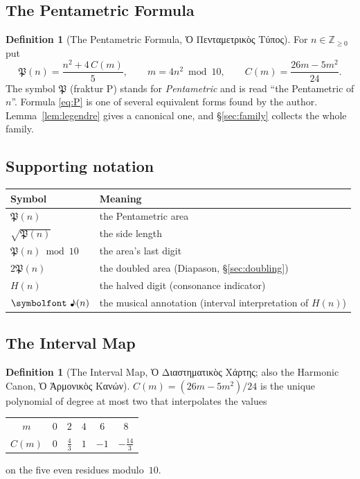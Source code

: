 \documentclass[11pt,a4paper]{article}
\newcommand{\gr}[1]{{\greekfont #1}}                 %
\newcommand{\Pent}{\mathfrak{P}}                      %
\newcommand{\note}{\text{\symbolfont ♪}}              %
\newcommand{\Z}{\mathbb{Z}}
\theoremstyle{plain}
\theoremstyle{definition}
\newtheorem{definition}[theorem]{Definition}
\theoremstyle{remark}
\begin{document}
\subsection{The Pentametric Formula}

\begin{definition}[The Pentametric Formula, \gr{Ὁ Πενταμετρικὸς Τύπος}]\label{def:P}
For $n\in\Z_{\ge0}$ put
\begin{equation}\label{eq:P}
  \Pent(n)=\frac{n^{2}+4\,C(m)}{5},\qquad m=4n^{2}\bmod 10,\qquad C(m)=\frac{26m-5m^{2}}{24}.
\end{equation}
The symbol $\Pent$ (fraktur P) stands for \emph{Pentametric} and is read “the Pentametric of $n$”. Formula \eqref{eq:P} is one of several equivalent forms found by the author. Lemma~\ref{lem:legendre} gives a canonical one, and §\ref{sec:family} collects the whole family.
\end{definition}

\subsection{Supporting notation}

\begin{center}
\begin{tabular}{@{}ll@{}}
\toprule
Symbol & Meaning \\
\midrule
$\Pent(n)$ & the Pentametric area \\
$\sqrt{\Pent(n)}$ & the side length \\
$\Pent(n)\bmod 10$ & the area's last digit \\
$2\Pent(n)$ & the doubled area (Diapason, §\ref{sec:doubling}) \\
$H(n)$ & the halved digit (consonance indicator) \\
$\note(n)$ & the musical annotation (interval interpretation of $H(n)$) \\
\bottomrule
\end{tabular}
\end{center}

\subsection{The Interval Map}

\begin{definition}[The Interval Map, \gr{Ὁ Διαστηματικὸς Χάρτης}; also the Harmonic Canon, \gr{Ὁ Ἁρμονικὸς Κανών}]
$C(m)=(26m-5m^{2})/24$ is the unique polynomial of degree at most two that interpolates the values
\begin{center}
\begin{tabular}{@{}cccccc@{}}
\toprule
$m$ & $0$ & $2$ & $4$ & $6$ & $8$\\
$C(m)$ & $0$ & $\tfrac43$ & $1$ & $-1$ & $-\tfrac{14}{3}$\\
\bottomrule
\end{tabular}
\end{center}
on the five even residues modulo~$10$.
\end{definition}
\end{document}
